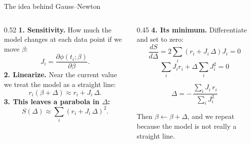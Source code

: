 \documentclass[aspectratio=169,10pt]{beamer}
\begin{document}
\begin{frame}{The idea behind Gauss--Newton}
  \begin{columns}[T]
    \begin{column}{0.52\textwidth}
      \textbf{1. Sensitivity.} How much the model changes at each data point if we move $\beta$:
      \[ J_i = \frac{\partial \phi(t_i;\beta)}{\partial \beta} . \]
      \textbf{2. Linearize.} Near the current value we treat the model as a straight line:
      \[ r_i(\beta + \Delta) \approx r_i + J_i\,\Delta . \]
      \textbf{3. This leaves a parabola in $\Delta$:}
      \[ S(\Delta) \approx \sum_i \left(r_i + J_i\,\Delta\right)^2 . \]
    \end{column}
    \begin{column}{0.45\textwidth}
      \textbf{4. Its minimum.} Differentiate and set to zero:
      \[ \frac{dS}{d\Delta} = 2\sum_i \left(r_i + J_i\,\Delta\right)J_i = 0 \]
      \[ \sum_i J_i r_i + \Delta \sum_i J_i^2 = 0 \]
      \begin{ecuacion}
        \[ \Delta = -\,\frac{\displaystyle\sum_i J_i\, r_i}{\displaystyle\sum_i J_i^2} \]
      \end{ecuacion}
      Then $\beta \leftarrow \beta + \Delta$, and we repeat because the model is not really a straight line.
    \end{column}
  \end{columns}
\end{frame}
\end{document}
